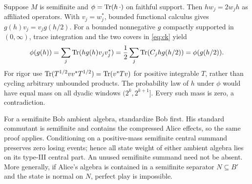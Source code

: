 Suppose $M$ is semifinite and $\phi=\operatorname{Tr}(h\,\cdot)$ on faithful support. Then $hw_j=2w_jh$ as affiliated operators. With $v_j=w_j^*$, bounded functional calculus gives $g(h)v_j=v_jg(h/2)$. For a bounded nonnegative $g$ compactly supported in $(0,\infty)$, trace integration and the two covers in \eqref{eq:ck} yield
\[
 \phi(g(h))=\sum_j\operatorname{Tr}(hg(h)v_jv_j^*)
 =\frac12\sum_j\operatorname{Tr}(C_jhg(h/2))=\phi(g(h/2)).
\]
For rigor use $\operatorname{Tr}(T^{1/2}vv^*T^{1/2})=\operatorname{Tr}(v^*Tv)$ for positive integrable $T$, rather than cycling arbitrary unbounded products. The probability law of $h$ under $\phi$ would have equal mass on all dyadic windows $(2^k,2^{k+1}]$. Every such mass is zero, a contradiction.

For a semifinite Bob ambient algebra, standardize Bob first. His standard commutant is semifinite and contains the compressed Alice effects, so the same proof applies. Conditioning on a positive-mass semifinite central summand preserves zero losing events; hence all state weight of either ambient algebra lies on its type-III central part. An unused semifinite summand need not be absent. More generally, if Alice's algebra is contained in a semifinite separator $N\subseteq B'$ and the state is normal on $N$, perfect play is impossible.
